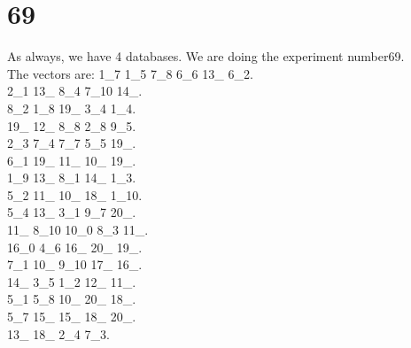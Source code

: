 \chapter{69}
\indent As always, we have 4 databases. We are doing the experiment number69.\\
The vectors are:
1\_7 1\_5 7\_8 6\_6 13\_ 6\_2.\\2\_1 13\_ 8\_4 7\_10 14\_.\\8\_2 1\_8 19\_ 3\_4 1\_4.\\19\_ 12\_ 8\_8 2\_8 9\_5.\\2\_3 7\_4 7\_7 5\_5 19\_.\\6\_1 19\_ 11\_ 10\_ 19\_.\\1\_9 13\_ 8\_1 14\_ 1\_3.\\5\_2 11\_ 10\_ 18\_ 1\_10.\\5\_4 13\_ 3\_1 9\_7 20\_.\\11\_ 8\_10 10\_0 8\_3 11\_.\\16\_0 4\_6 16\_ 20\_ 19\_.\\7\_1 10\_ 9\_10 17\_ 16\_.\\14\_ 3\_5 1\_2 12\_ 11\_.\\5\_1 5\_8 10\_ 20\_ 18\_.\\5\_7 15\_ 15\_ 18\_ 20\_.\\13\_ 18\_ 2\_4 7\_3.\\